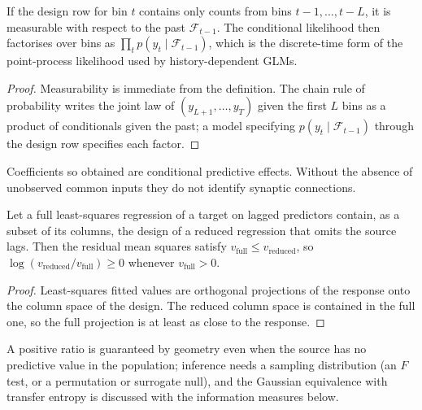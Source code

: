 \begin{proposition}\label{ars:glm-002}
If the design row for bin $t$ contains only counts from bins $t-1,\dots,t-L$, it is measurable with respect to the past $\mathcal F_{t-1}$. The conditional likelihood then factorises over bins as $\prod_t p(y_t\mid\mathcal F_{t-1})$, which is the discrete-time form of the point-process likelihood used by history-dependent GLMs.
\end{proposition}
\begin{proof}
Measurability is immediate from the definition. The chain rule of probability writes the joint law of $(y_{L+1},\dots,y_T)$ given the first $L$ bins as a product of conditionals given the past; a model specifying $p(y_t\mid\mathcal F_{t-1})$ through the design row specifies each factor.
\end{proof}
Coefficients so obtained are conditional predictive effects. Without the absence of unobserved common inputs they do not identify synaptic connections.

\begin{theorem}\label{ars:var-001}
Let a full least-squares regression of a target on lagged predictors contain, as a subset of its columns, the design of a reduced regression that omits the source lags. Then the residual mean squares satisfy $v_{\text{full}}\le v_{\text{reduced}}$, so $\log(v_{\text{reduced}}/v_{\text{full}})\ge0$ whenever $v_{\text{full}}>0$.
\end{theorem}
\begin{proof}
Least-squares fitted values are orthogonal projections of the response onto the column space of the design. The reduced column space is contained in the full one, so the full projection is at least as close to the response.
\end{proof}
A positive ratio is guaranteed by geometry even when the source has no predictive value in the population; inference needs a sampling distribution (an $F$ test, or a permutation or surrogate null), and the Gaussian equivalence with transfer entropy is discussed with the information measures below.

